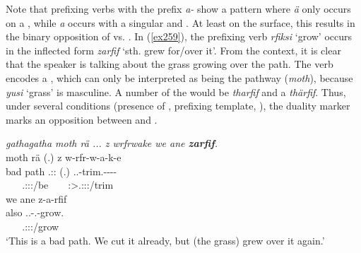 Note that prefixing verbs with the  prefix \emph{a-} show a pattern where \emph{ä} only occurs on a , while \emph{a} occurs with a singular and  . At least on the surface, this results in the binary opposition of  vs. . In (\ref{ex259}), the prefixing verb \emph{rfiksi} `grow' occurs in the inflected form \emph{zarfif} `sth. grew for/over it'. From the context, it is clear that the speaker is talking about the grass growing over the path. The verb encodes a  , which can only be interpreted as being the pathway (\emph{moth}), because \emph{yusi} `grass' is masculine. A  number of the  would be \emph{tharfif} and a  \emph{thärfif}. Thus, under several conditions (presence of , prefixing template, ), the duality marker marks an opposition between  and .

\begin{exe}
	\ex \emph{gathagatha moth rä ... z wrfrwake we ane \textbf{zarfif}.}\\
	 moth rä (.) z w-rfr-w-a-k-e\\
	bad path \Tsg.\F:\Cop:{\Ndu} (.) {\Iam} \Tsg.\F.\Alph-trim.\Ext-\Ndu-\Pst-\Lk-{\Fnsg}\\
	~ ~ {\footnotesize \Tsg.\F:\Sbj:\Nonpast:\Ipfv/be} ~ ~ {\footnotesize \Fpl:\Sbj>\Tsg.\F:\Obj:\Pst:\Ipfv/trim}\\
	\sn
	\glll we ane z-a-rfif\\
	also {\Dem} \Tsg.\F.\Gam-\Ndu.\Vc-grow.\Rs\\
	~ ~ {\footnotesize \Tsg.\F:\Io:\Rpst:\Pfv/grow}\\
	\trans `This is a bad path. We cut it already, but (the grass) grew over it again.'\\ 
	\label{ex259}
\end{exe}

